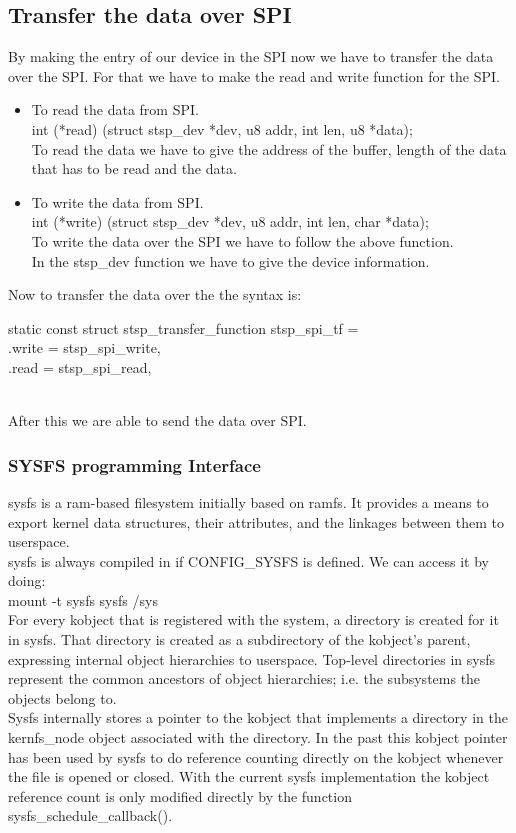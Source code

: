 \subsection{Transfer the data over SPI}
By making the entry of our device in the SPI now we have to transfer the data over the SPI. For that we have to make the read and write function for the SPI.
\begin{itemize}
	\item To read the data from SPI. \\
	int (*read) (struct stsp\_dev *dev, u8 addr, int len, u8 *data);\\
	To read the data we have to give the address of the buffer, length of the data that has to be read and the data.
	\item To write the data from SPI. \\
	int (*write) (struct stsp\_dev *dev, u8 addr, int len, char *data);\\
	To write the data over the SPI we have to follow the above function.\\
In the stsp\_dev function we have to give the device information.\\
\end{itemize}
Now to transfer the data over the the syntax is: \\
\begin{code}
static const struct stsp\_transfer\_function stsp\_spi\_tf = \lbrace \\
	.write = stsp\_spi\_write, \\
	.read = stsp\_spi\_read, \\
	\rbrace \\
\end{code}
	After this we are able to send the data over SPI. \\
\subsubsection{SYSFS programming Interface}
sysfs is a ram-based filesystem initially based on ramfs. It provides
a means to export kernel data structures, their attributes, and the 
linkages between them to userspace.\\
sysfs is always compiled in if CONFIG\_SYSFS is defined. We can access
it by doing:\\

    mount -t sysfs sysfs /sys\\
    For every kobject that is registered with the system, a directory is
    created for it in sysfs. That directory is created as a subdirectory
    of the kobject's parent, expressing internal object hierarchies to
    userspace. Top-level directories in sysfs represent the common
    ancestors of object hierarchies; i.e. the subsystems the objects
    belong to.\\
    Sysfs internally stores a pointer to the kobject that implements a
    directory in the kernfs\_node object associated with the directory. In
    the past this kobject pointer has been used by sysfs to do reference
    counting directly on the kobject whenever the file is opened or closed.
    With the current sysfs implementation the kobject reference count is
    only modified directly by the function sysfs\_schedule\_callback().

